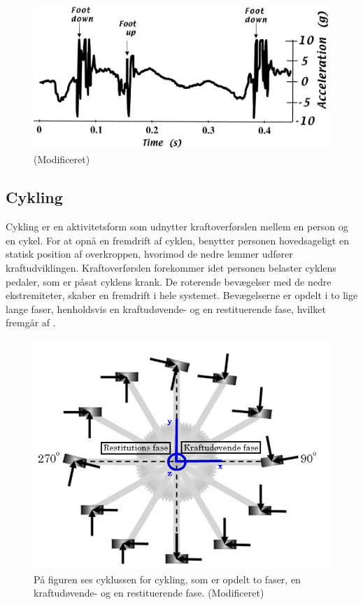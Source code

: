 \begin{figure}[H]
	\centering
	\includegraphics[scale=0.4]{figures/bProblemloesning/loeb_skolebog.png}
	\caption{ \citep{WeyandKelly2001} (Modificeret)}
	\label{fig:loeb_skolebog}
\end{figure}

\subsection{Cykling}
Cykling er en aktivitetsform som udnytter kraftoverførslen mellem en person og en cykel. For at opnå en fremdrift af cyklen, benytter personen hovedsageligt en statisk position af overkroppen, hvorimod de nedre lemmer udfører kraftudviklingen. \citep{Springer2014} \newline 
Kraftoverførslen forekommer idet personen belaster cyklens pedaler, som er påsat cyklens krank. De roterende bevægelser med de nedre ekstremiteter, skaber en fremdrift i hele systemet. Bevægelserne er opdelt i to lige lange faser, henholdsvis en kraftudøvende- og en restituerende fase, hvilket fremgår af .

\begin{figure}[H]
	\centering
	\includegraphics[scale=0.5]{figures/bProblemloesning/cykel_cyklus.png}
	\caption{På figuren ses cyklussen for cykling, som er opdelt to faser, en kraftudøvende- og en restituerende fase. \citep{Springer2014} (Modificeret)}
	\label{fig:cykel_cyklus}
\end{figure}

